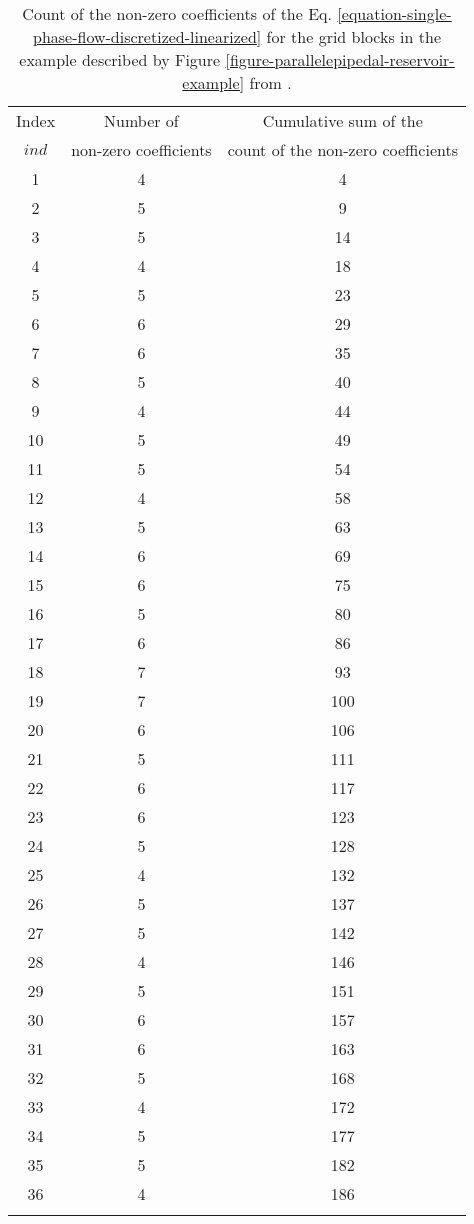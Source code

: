 \begin{center}
	\begin{longtable}[htbp]{c c c}
		\caption{Count of the non-zero coefficients of the Eq. \ref{equation-single-phase-flow-discretized-linearized} for the grid blocks in the example described by Figure \ref{figure-parallelepipedal-reservoir-example} from \cite{Ertekin2001}.}\\
		\toprule
		Index & Number of & Cumulative sum of the\\
		$ind$ &	non-zero coefficients	&	count of the non-zero coefficients\\
		\midrule
		1	&	4	&	4	\\
		2	&	5	&	9	\\
		3	&	5	&	14	\\
		4	&	4	&	18	\\
		5	&	5	&	23	\\
		6	&	6	&	29	\\
		7	&	6	&	35	\\
		8	&	5	&	40	\\
		9	&	4	&	44	\\
		10	&	5	&	49	\\
		11	&	5	&	54	\\
		12	&	4	&	58	\\
		13	&	5	&	63	\\
		14	&	6	&	69	\\
		15	&	6	&	75	\\
		16	&	5	&	80	\\
		17	&	6	&	86	\\
		18	&	7	&	93	\\
		19	&	7	&	100	\\
		20	&	6	&	106	\\
		21	&	5	&	111	\\
		22	&	6	&	117	\\
		23	&	6	&	123	\\
		24	&	5	&	128	\\
		25	&	4	&	132	\\
		26	&	5	&	137	\\
		27	&	5	&	142	\\
		28	&	4	&	146	\\
		29	&	5	&	151	\\
		30	&	6	&	157	\\
		31	&	6	&	163	\\
		32	&	5	&	168	\\
		33	&	4	&	172	\\
		34	&	5	&	177	\\
		35	&	5	&	182	\\
		36	&	4	&	186	\\
		\bottomrule
		\label{table_Ap}
	\end{longtable}
\end{center}
